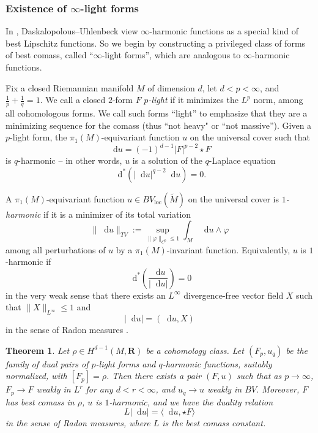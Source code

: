 \documentclass[reqno,11pt]{amsart}
\newcommand{\RR}{\mathbf{R}}
\newcommand*\dif{\mathop{}\!\mathrm{d}}
\newcommand{\dfn}[1]{\emph{#1}\index{#1}}
\newcommand{\loc}{\mathrm{loc}}
\newtheorem{mainthm}{Theorem}
\theoremstyle{definition}
\numberwithin{equation}{section}
\begin{document}
\subsubsection{Existence of $\infty$-light forms}
In \cite{daskalopoulos2020transverse}, Daskalopolous--Uhlenbeck view $\infty$-harmonic functions as a special kind of best Lipschitz functions.
So we begin by constructing a privileged class of forms of best comass, called ``$\infty$-light forms'', which are analogous to $\infty$-harmonic functions.

Fix a closed Riemannian manifold $M$ of dimension $d$, let $d < p < \infty$, and $\frac{1}{p} + \frac{1}{q} = 1$.
We call a closed $2$-form $F$ \dfn{$p$-light} if it minimizes the $L^p$ norm, among all cohomologous forms.
We call such forms ``light'' to emphasize that they are a minimizing sequence for the comass (thus ``not heavy" or ``not massive'').
Given a $p$-light form, the $\pi_1(M)$-equivariant function $u$ on the universal cover such that
$$\dif u = (-1)^{d - 1} |F|^{p - 2} \star F$$
is $q$-harmonic -- in other words, $u$ is a solution of the $q$-Laplace equation 
$$\dif^*(|\dif u|^{q - 2} \dif u) = 0.$$

A $\pi_1(M)$-equivariant function $u \in BV_\loc(\tilde M)$ on the universal cover is \dfn{$1$-harmonic} if it is a minimizer of its total variation 
$$\|\dif u\|_{TV} := \sup_{\|\varphi\|_{C^0} \leq 1} \int_M \dif u \wedge \varphi$$
among all perturbations of $u$ by a $\pi_1(M)$-invariant function.
Equivalently, $u$ is $1$-harmonic if 
$$\dif^* \left(\frac{\dif u}{|\dif u|}\right) = 0$$
in the very weak sense that there exists an $L^\infty$ divergence-free vector field $X$ such that $\|X\|_{L^\infty} \leq 1$ and
$$|\dif u| = (\dif u, X)$$
in the sense of Radon measures \cite{Mazon14}.

\begin{mainthm}\label{existence of infinity light forms}
Let $\rho \in H^{d - 1}(M, \RR)$ be a cohomology class.
Let $(F_p, u_q)$ be the family of dual pairs of $p$-light forms and $q$-harmonic functions, suitably normalized, with $[F_p] = \rho$.
Then there exists a pair $(F, u)$ such that as $p \to \infty$, $F_p \to F$ weakly in $L^r$ for any $d < r < \infty$, and $u_q \to u$ weakly in $BV$.
Moreover, $F$ has best comass in $\rho$, $u$ is $1$-harmonic, and we have the duality relation 
\begin{equation}\label{max flow mean cut}
L|\dif u| = \langle \dif u, \star F\rangle
\end{equation}
in the sense of Radon measures, where $L$ is the best comass constant.
\end{mainthm}
\end{document}
